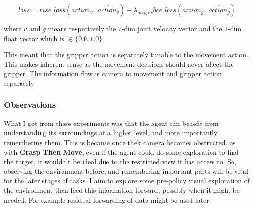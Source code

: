 \[
  loss = mse\_loss \left(action_{v}, ~\hat{action_v}\right) 
  + 
  \lambda_{gripper} bce\_loss\left( action_{g}, ~\hat{action_g}\right)
\]

where $v$ and $g$ means respectively the $7$-dim joint velocity vector and the $1$-dim float vector which is \( \in \{ 0.0, 1.0 \}\)

This meant that the gripper action is separately tunable to the movement action. This makes inherent sense as the movement decisions should never affect the gripper. The information flow is camera to movement and gripper action separately  


\subsubsection{Observations}
What I got from these experiments was that the agent can benefit from understanding its surroundings at a higher level, and more importantly remembering them. This is because once thek camera becomes obstructed, as with \textbf{Grasp Then Move}, even if the agent could do some exploration to find the target, it wouldn't be ideal due to the restricted view it has access to. So, observing the environment before, and remembering important parts will be vital for the later stages of tasks. I aim to explore some pre-policy visual exploration of the environment then feed this information forward, possibly when it might be needed. For example residual forwarding of data might be used later 

